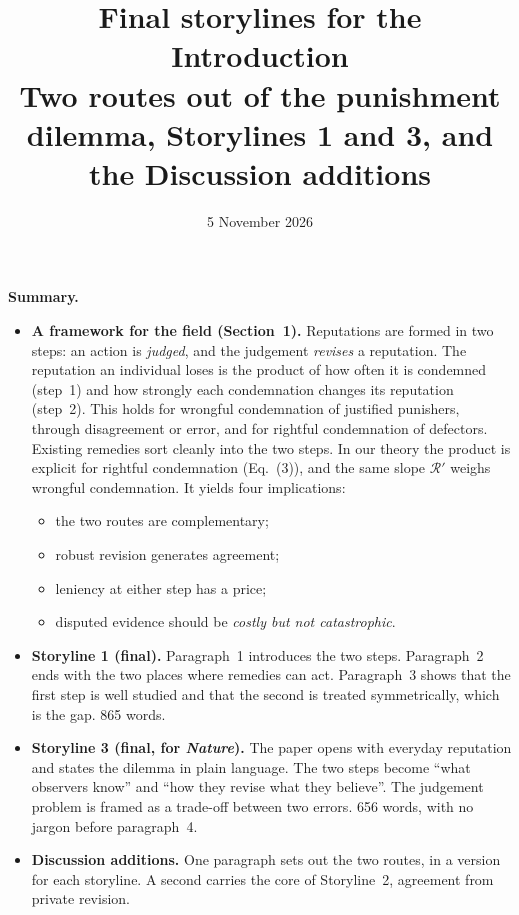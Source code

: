 \documentclass[11pt]{article}
\title{\large\bfseries Final storylines for the Introduction\\[0.2em]
\normalsize Two routes out of the punishment dilemma, Storylines 1 and 3, and the Discussion additions}
\date{5 November 2026}
\newcommand{\Rmap}{\mathscr{R}}
\begin{document}
\maketitle
\vspace{-1.5em}

\begin{keypoint}
\textbf{Summary.}
\begin{itemize}[leftmargin=1.2em]
\item \textbf{A framework for the field (Section~1).} Reputations are formed in two steps: an action is \emph{judged}, and the judgement \emph{revises} a reputation. The reputation an individual loses is the product of how often it is condemned (step~1) and how strongly each condemnation changes its reputation (step~2). This holds for wrongful condemnation of justified punishers, through disagreement or error, and for rightful condemnation of defectors. Existing remedies sort cleanly into the two steps. In our theory the product is explicit for rightful condemnation (Eq.~(3)), and the same slope $\Rmap'$ weighs wrongful condemnation. It yields four implications:
  \begin{itemize}[leftmargin=1.2em]
  \item the two routes are complementary;
  \item robust revision generates agreement;
  \item leniency at either step has a price;
  \item disputed evidence should be \emph{costly but not catastrophic}.
  \end{itemize}
\item \textbf{Storyline 1 (final).} Paragraph~1 introduces the two steps. Paragraph~2 ends with the two places where remedies can act. Paragraph~3 shows that the first step is well studied and that the second is treated symmetrically, which is the gap. 865 words.
\item \textbf{Storyline 3 (final, for \textit{Nature}).} The paper opens with everyday reputation and states the dilemma in plain language. The two steps become ``what observers know'' and ``how they revise what they believe''. The judgement problem is framed as a trade-off between two errors. 656 words, with no jargon before paragraph~4.
\item \textbf{Discussion additions.} One paragraph sets out the two routes, in a version for each storyline. A second carries the core of Storyline~2, agreement from private revision.
\end{itemize}
\end{keypoint}
\end{document}
